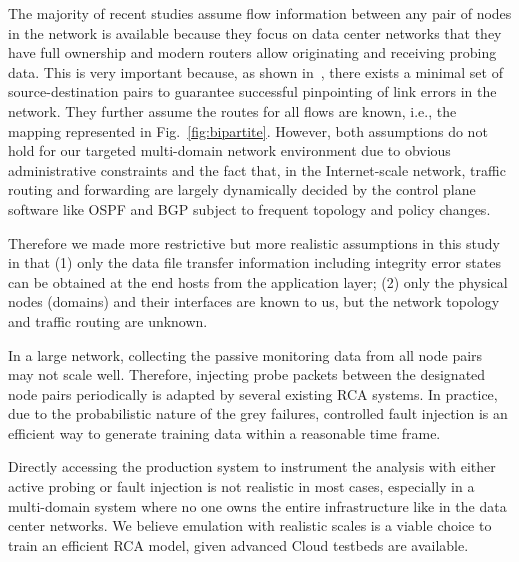 The majority of recent studies assume flow information between any pair of nodes in the network is available because they focus on data center networks that they have full ownership and modern routers allow originating and receiving probing data. This is very important because, as shown in~\cite{netbouncer:nsdi18}, there exists a minimal set of source-destination pairs to guarantee successful pinpointing of link errors in the network. They further assume the routes for all flows are known, i.e., the mapping represented in Fig.~\ref{fig:bipartite}. However, both assumptions do not hold for our targeted multi-domain network environment due to obvious administrative constraints and the fact that, in the Internet-scale network, traffic routing and forwarding are largely dynamically decided by the control plane software like OSPF and BGP subject to frequent topology and policy changes. 

Therefore we made more restrictive but more realistic assumptions in this study in that (1) only the data file transfer information including integrity error states can be obtained at the end hosts from the application layer; (2) only the physical nodes (domains) and their interfaces are known to us, but the network topology and traffic routing are unknown. 

In a large network, collecting the passive monitoring data from all node pairs may not scale well. Therefore, injecting probe packets between the designated node pairs periodically is adapted by several existing RCA systems. In practice, due to the probabilistic nature of the grey failures, controlled fault injection is an efficient way to generate training data within a reasonable time frame.

Directly accessing the production system to instrument the analysis with either active probing or fault injection is not realistic in most cases, especially in a multi-domain system where no one owns the entire infrastructure like in the data center networks. We believe emulation with realistic scales is a viable choice to train an efficient RCA model, given advanced Cloud testbeds are available.









